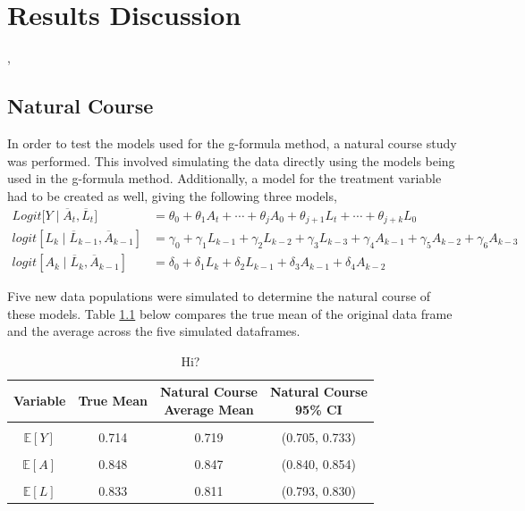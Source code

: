 
\chapter{Results Discussion}

, 

\section{Natural Course} 
In order to test the models used for the g-formula method, a natural course study was performed.  This involved simulating the data directly using the models being used in the g-formula method.  Additionally, a model for the treatment variable had to be created as well, giving the following three models, 
\begin{align} 
Logit \big[Y \mid \overline{A}_t, \overline{L}_t \big] &= \theta_{0} + \theta_1 A_{t} + \cdots + \theta_j A_0 + \theta_{j+1} L_t + \cdots + \theta_{j+k} L_0  \\ 
logit[L_k \mid \overline{L}_{k-1}, \overline{A}_{k-1}] &= \gamma_0 + \gamma_1 L_{k-1} + \gamma_2 L_{k-2} + \gamma_3 L_{k-3}  + \gamma_4 A_{k-1} + \gamma_5 A_{k-2} + \gamma_6 A_{k-3} \\ 
logit[A_k \mid \overline{L}_{k}, \overline{A}_{k-1}] &= \delta_0 + \delta_1 L_{k} + \delta_2 L_{k-1} + \delta_3 A_{k-1} + \delta_4 A_{k-2} 
\end{align} 

Five new data populations were simulated to determine the natural course of these models.  Table \ref{naturalcourse} below compares the true mean of the original data frame and the average across the five simulated dataframes.  


\begin{table}[h!]
\centering
\begin{tabular}{c | c c c}
Variable & True Mean & \shortstack{Natural Course\\ Average Mean} & \shortstack{Natural Course \\95\% CI} \\ 
\hline \\
$\mathbb{E}[Y]$ & 0.714 & 0.719 & (0.705, 0.733) \\ \\
$\mathbb{E}[A]$ & 0.848 & 0.847 & (0.840, 0.854) \\ \\
$\mathbb{E}[L]$ & 0.833 & 0.811 & (0.793, 0.830) 
\end{tabular} \\
\centering
\caption{Hi? \label{naturalcourse}}
\end{table}

